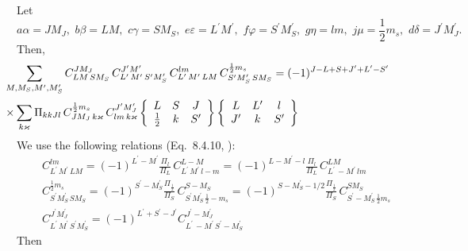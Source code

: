 \documentclass[a4paper,oneside,12pt]{extarticle}
\begin{document}
%
Let
$$
a\alpha=JM_J,\,\, b\beta=LM, \,\, c\gamma = S M_S,
\,\, e\varepsilon=L^{\prime} M^{\prime}, \,\,
f \varphi=S^{\prime} M_S^{\prime}, \,\,
g\eta=lm , \,\, j\mu=\frac{1}{2} m_s, \,\, d \delta=J^{\prime} M_J^{\prime}.
$$
%
Then,
%
\begin{equation}
\hspace{-12mm}
\begin{array}{l} \displaystyle
\sum_{M, M_S,M^{\prime}, M_S^{\prime}} C^{JM_J}_{LM \, S M_S} \,
C^{J^{\prime}M^{\prime}}_{L^{\prime} \,M^{\prime} \, S^{\prime} M_S^{\prime}} \,
C^{lm}_{L^{\prime} \,M^{\prime} \, LM} \,
C^{\frac{1}{2} m_s}_{ S^{\prime} M_S^{\prime}  \, S M_S} = \displaystyle
(-1)^{J-L+S+J^{\prime}+L^{\prime}-S^{\prime}}
%
\\[6mm] \times \displaystyle
%
\sum_{k \varkappa}
\Pi_{kkJl} \, C^{\frac{1}{2} m_s}_{J M_J \, k\varkappa} \,
C^{J^{\prime} M_J^{\prime}}_{lm \, k\varkappa}
\left \{
\begin{array}{ccc}
L & S & J \\
\frac{1}{2} & k & S^{\prime}
\end{array}
\right \}
\left \{
\begin{array}{ccc}
L & L^{\prime} & l \\
J^{\prime} & k & S^{\prime}
\end{array}
\right \}
%
\end{array}
\end{equation}
%
We use the following relations (Eq.~8.4.10, \cite{Varshalovich}):
$$
\begin{array}{l} \displaystyle
C^{lm}_{L^{\prime} \,M^{\prime} \, LM} = (-1)^{L^{\prime}-M^{\prime}}
\frac{\Pi_{l}}{\Pi_L} \, C^{L-M}_{L^{\prime} \,M^{\prime} \, l-m}=
(-1)^{L-M^{\prime}-l}
\frac{\Pi_{l}}{\Pi_L} \, C^{LM}_{L^{\prime} \,-M^{\prime} \, lm}
%
\\[6mm] \displaystyle
%
C^{\frac{1}{2} m_s}_{ S^{\prime} M_S^{\prime}  \, S M_S}=
(-1)^{ S^{\prime}-M_S^{\prime}} \frac{\Pi_{\frac{1}{2}}}{\Pi_S} \,
C^{S -M_S}_{ S^{\prime} M_S^{\prime}  \,\frac{1}{2} -m_s }=
(-1)^{ S-M_S^{\prime}-1/2} \frac{\Pi_{\frac{1}{2}}}{\Pi_S} \,
C^{S M_S}_{ S^{\prime} -M_S^{\prime}  \,\frac{1}{2} m_s }
%
\\[6mm] \displaystyle
%
C^{J^{\prime}M_J^{\prime}}_{L^{\prime} \,M^{\prime} \,
S^{\prime} M_S^{\prime}} = (-1)^{L^{\prime}+S^{\prime}-J^{\prime}} 
C^{J^{\prime} -M_J^{\prime}}_{L^{\prime} \, -M^{\prime} \,
S^{\prime} -M_S^{\prime}}
\end{array}
$$
%
Then
%
\end{document}
